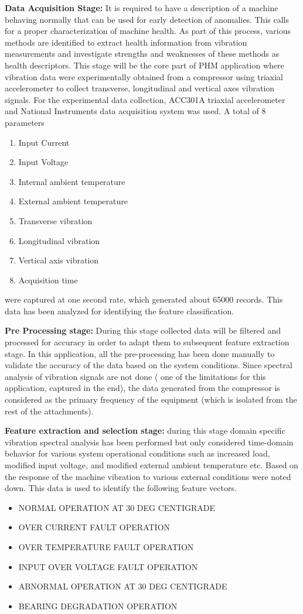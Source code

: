 \documentclass[sigconf]{acmart}
\begin{document}
\textbf{Data Acquisition Stage:} It is required to have a description of a machine behaving normally that can be used for
early detection of anomalies. This calls for a proper characterization of machine health. As part of this process, various methods are identified to extract health information from vibration measurements and investigate strengths and weaknesses of these methods as health descriptors. This stage will be the core part of PHM application where vibration data were experimentally obtained from a compressor using triaxial accelerometer to collect transverse, longitudinal and vertical axes vibration signals. For the experimental data collection, ACC301A triaxial accelerometer and National Instruments data acquisition system was used. A total of 8 parameters 
\begin{enumerate}
\item Input Current
\item Input Voltage
\item Internal ambient temperature
\item External ambient temperature
\item Transverse vibration
\item Longitudinal vibration 
\item Vertical axis vibration
\item Acquisition time
\end{enumerate}
were captured at one second rate, which generated about 65000 records. This data has been analyzed for identifying the feature classification.

\textbf{Pre Processing stage:} During this stage collected data will be filtered and processed for accuracy in order to adapt them to subsequent feature extraction stage. In this application, all the pre-processing has been done manually to validate the accuracy of the data based on the system conditions. Since spectral analysis of vibration signals are not done ( one of the limitations for this application, captured in the end), the data generated from the compressor is considered as the primary frequency of the equipment (which is isolated from the rest of the attachments).

\textbf{Feature extraction and selection stage:} during this stage domain specific vibration spectral analysis has been performed but only considered time-domain behavior for various system operational conditions such as increased load, modified input voltage, and modified external ambient temperature etc. Based on the response of the machine vibration to various external conditions were noted down. This data is used to identify the following feature vectors.
\begin{itemize}
\item NORMAL OPERATION AT 30 DEG CENTIGRADE
\item OVER CURRENT FAULT OPERATION
\item OVER TEMPERATURE FAULT OPERATION
\item INPUT OVER VOLTAGE FAULT OPERATION
\item ABNORMAL OPERATION AT 30 DEG CENTIGRADE
\item BEARING DEGRADATION OPERATION
\end{itemize}
\end{document}
